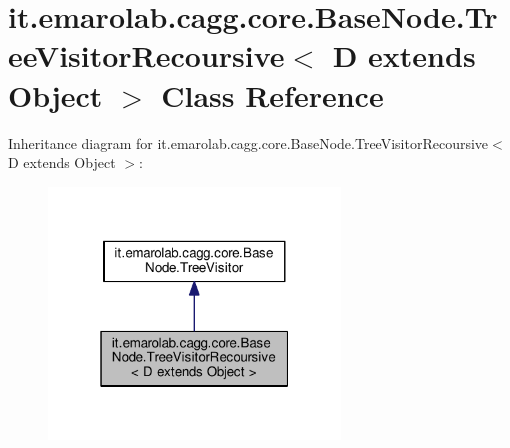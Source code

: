 \hypertarget{classit_1_1emarolab_1_1cagg_1_1core_1_1BaseNode_1_1TreeVisitorRecoursive_3_01D_01extends_01Object_01_4}{\section{it.\-emarolab.\-cagg.\-core.\-Base\-Node.\-Tree\-Visitor\-Recoursive$<$ D extends Object $>$ Class Reference}
\label{classit_1_1emarolab_1_1cagg_1_1core_1_1BaseNode_1_1TreeVisitorRecoursive_3_01D_01extends_01Object_01_4}
}


Inheritance diagram for it.\-emarolab.\-cagg.\-core.\-Base\-Node.\-Tree\-Visitor\-Recoursive$<$ D extends Object $>$\-:\nopagebreak
\begin{figure}[H]
\begin{center}
\leavevmode
\includegraphics[width=220pt]{classit_1_1emarolab_1_1cagg_1_1core_1_1BaseNode_1_1TreeVisitorRecoursive_3_01D_01extends_01Object_01_4__inherit__graph}
\end{center}
\end{figure}


